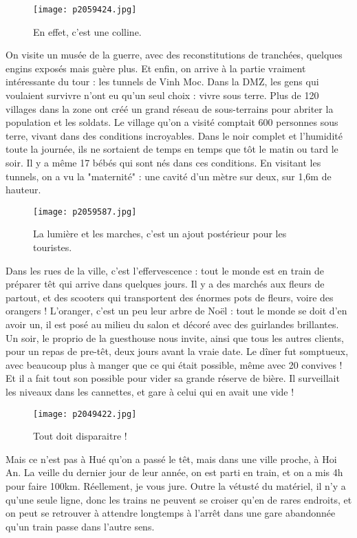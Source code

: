 \documentclass{book}
\begin{document}
\begin{figure}[h]
\centering
\texttt{[image: p2059424.jpg]}
\caption*{En effet, c'est une colline.}
\end{figure}

On visite un musée de la guerre, avec des reconstitutions de tranchées, quelques engins exposés mais guère plus. Et enfin, on arrive à la partie vraiment intéressante du tour : les tunnels de Vinh Moc. Dans la DMZ, les gens qui voulaient survivre n'ont eu qu'un seul choix : vivre sous terre. Plus de 120 villages dans la zone ont créé un grand réseau de sous-terrains pour abriter la population et les soldats. Le village qu'on a visité comptait 600 personnes sous terre, vivant dans des conditions incroyables. Dans le noir complet et l'humidité toute la journée, ils ne sortaient de temps en temps que tôt le matin ou tard le soir. Il y a même 17 bébés qui sont nés dans ces conditions. En visitant les tunnels, on a vu la "maternité" : une cavité d'un mètre sur deux, sur 1,6m de hauteur.




\begin{figure}[h]
\centering
\texttt{[image: p2059587.jpg]}
\caption*{La lumière et les marches, c'est un ajout postérieur pour les touristes.}
\end{figure}

Dans les rues de la ville, c'est l'effervescence : tout le monde est en train de préparer têt qui arrive dans quelques jours. Il y a des marchés aux fleurs de partout, et des scooters qui transportent des énormes pots de fleurs, voire des orangers ! L'oranger, c'est un peu leur arbre de Noël : tout le monde se doit d'en avoir un, il est posé au milieu du salon et décoré avec des guirlandes brillantes.
Un soir, le proprio de la guesthouse nous invite, ainsi que tous les autres clients, pour un repas de pre-têt, deux jours avant la vraie date. Le dîner fut somptueux, avec beaucoup plus à manger que ce qui était possible, même avec 20 convives ! Et il a fait tout son possible pour vider sa grande réserve de bière. Il surveillait les niveaux dans les cannettes, et gare à celui qui en avait une vide !


\begin{figure}[h]
\centering
\texttt{[image: p2049422.jpg]}
\caption*{Tout doit disparaitre !}
\end{figure}

Mais ce n'est pas à Hué qu'on a passé le têt, mais dans une ville proche, à Hoi An. La veille du dernier jour de leur année, on est parti en train, et on a mis 4h pour faire 100km. Réellement, je vous jure. Outre la vétusté du matériel, il n'y a qu'une seule ligne, donc les trains ne peuvent se croiser qu'en de rares endroits, et on peut se retrouver à attendre longtemps à l'arrêt dans une gare abandonnée qu'un train passe dans l'autre sens.
\end{document}
